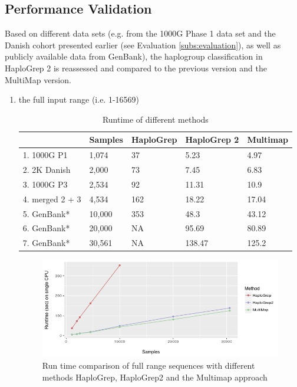 \subsection{Performance Validation}
Based on different data sets (e.g. from the 1000G Phase 1 data set and the Danish cohort presented earlier (see Evaluation \ref{subs:evaluation}), as well as publicly available data from GenBank), the haplogroup classification in HaploGrep 2 is reassessed and compared to the previous version and the MultiMap version. 
\begin{enumerate}[label=(\alph*)]
\item  the full input range (i.e. 1-16569)
\begin{table}[H]
\centering
\caption{Runtime of different methods}
\label{hg:runtime1}
\begin{tabular}{|l|l|l|l|l|}
\hline
             & Samples & HaploGrep & HaploGrep 2 & Multimap \\ \hline
1. 1000G P1  & 1,074   & 37  & 5.23        & 4.97         \\ \hline
2. 2K Danish & 2,000   & 73 & 7.45       & 6.83        \\ \hline
3. 1000G P3  & 2,534   & 92 & 11.31      & 10.9         \\ \hline
4. merged 2 + 3 & 4,534   & 162 & 18.22       & 17.04        \\ \hline
5. GenBank* & 10,000   & 353 & 48.3       & 43.12         \\ \hline
6. GenBank*  & 20,000   & NA & 95.69       & 80.89         \\ \hline
7. GenBank*  & 30,561   & NA & 138.47      & 125.2        \\ \hline
\end{tabular}
\end{table}

\begin{figure}[!ht]
    \centering
    \includegraphics[width=1\textwidth]{images/multimap.png}
    \caption[Run time comparison of HaploGrep versions]{Run time comparison of full range sequences with different methods HaploGrep, HaploGrep2 and the Multimap approach} 
    \label{hg:mutlimap}
\end{figure}


\end{enumerate}
